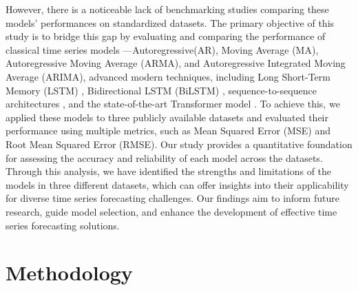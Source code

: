 \documentclass[sn-mathphys-num]{sn-jnl}
\theoremstyle{thmstyleone}%
\theoremstyle{thmstyletwo}%
\theoremstyle{thmstylethree}%
\begin{document}
However, there is a noticeable lack of benchmarking studies comparing these models' performances on standardized datasets. The primary objective of this study is to bridge this gap by evaluating and comparing the performance of classical time series models \cite{box2015time}—Autoregressive(AR), Moving Average (MA), Autoregressive Moving Average (ARMA), and Autoregressive Integrated Moving Average (ARIMA), advanced modern techniques, including Long Short-Term Memory (LSTM) \cite{hochreiter1997lstm}, Bidirectional LSTM (BiLSTM) \cite{graves2005framewise}, sequence-to-sequence architectures \cite{sutskever2014seq2seq}, and the state-of-the-art Transformer model \cite{vaswani2017attention}. To achieve this, we applied these models to three publicly available datasets and evaluated their performance using multiple metrics, such as Mean Squared Error (MSE) and Root Mean Squared Error (RMSE). Our study provides a quantitative foundation for assessing the accuracy and reliability of each model across the datasets. Through this analysis, we have identified the strengths and limitations of the models in three different datasets, which can offer insights into their applicability for diverse time series forecasting challenges. Our findings aim to inform future research, guide model selection, and enhance the development of effective time series forecasting solutions.

\section{Methodology}
\end{document}

